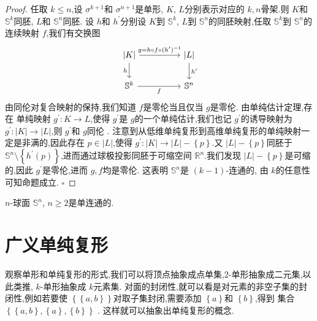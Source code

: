 \documentclass[../../几何与拓扑.tex]{subfiles}
\begin{document}
\begin{proof}
    任取 \(  k\le n  \),设 \(   \sigma ^{k+ 1}  \)和 \(   \sigma ^{n+ 1}  \)是单形, \(  K  \), \(  L  \)分别表示对应的 \(  k , n  \)骨架.则 \(  K  \)和 \(  \mathbb{S}^{k}  \)同胚, \(  L  \)和 \(  \mathbb{S}^{n}  \)同胚.
    设 \(  h  \)和 \(  h^{\prime}   \)分别设 \(  K  \)到 \(  \mathbb{S}^{k}  \), \(  L  \)到 \(  \mathbb{S}^{n}  \)的同胚映射,任取 \(  \mathbb{S}^{k}  \)到 \(  \mathbb{S}^{n}  \)的连续映射 \(  f  \),我们有交换图                  
    \[\begin{tikzcd}
	{|K|} && {|L|} \\
	{\mathbb{S}^k} && {\mathbb{S}^n}
	\arrow["{g = h\circ f\circ (h^{\prime})^{-1}}", from=1-1, to=1-3]
	\arrow["h"', from=1-1, to=2-1]
	\arrow["{h^{\prime}}", from=1-3, to=2-3]
	\arrow["f"', from=2-1, to=2-3]
\end{tikzcd}\]
    由同伦对复合映射的保持,我们知道 \(  f  \)是零伦当且仅当 \(  g  \)是零伦. 
    由单纯估计定理,存在 单纯映射 \(  g^{\prime} : K\to L  \),使得 \(  g^{\prime}   \)是 \(  g  \)的一个单纯估计,我们也记 \(  g^{\prime}   \)的诱导映射为 \(  g^{\prime} : \left| K \right|\to \left| L \right|    \),则 \(  g^{\prime}   \)和 \(  g  \)同伦  .     
    注意到从低维单纯复形到高维单纯复形的单纯映射一定是非满的,因此存在 \(  p \in \left| L \right|   \),使得 \(  g^{\prime} : \left| K \right|\to  \left| L \right|-\left\{ p \right\}    \).又 \(  \left| L \right|-\left\{ p \right\}   \)同胚于 \(  \mathbb{S}^{n}\setminus \left\{ h^{\prime} \left( p \right)  \right\}  \),进而通过球极投影同胚于可缩空间 \(  \mathbb{R} ^{n}  \).我们发现 \(  \left| L \right|-\left\{ p \right\}   \)是可缩的,因此 \(  g^{\prime}   \)是零伦,进而 \(  g, f  \)均是零伦.
    这表明 \(  \mathbb{S}^{n}  \)是 \(  \left( k-1 \right)   \)-连通的, 由 \(  k  \)的任意性可知命题成立.           
    \hfill $\square$
\end{proof}




\begin{corollary}
     \(  n  \)-球面 \(  \mathbb{S}^{n}  \), \(  n\ge 2  \)是单连通的.   
\end{corollary}


\section{广义单纯复形}

观察单形和单纯复形的形式,我们可以将顶点抽象成点单集,2-单形抽象成二元集,以此类推, \(  k  \)-单形抽象成 \(  k  \)元素集.
对面的封闭性,就可以看是对元素的非空子集的封闭性,例如若要使 \(  \left\{ \left\{ a,b \right\} \right\}  \)对取子集封闭,需要添加 \(  \left\{ a \right\}  \)和 \(  \left\{ b \right\}  \),得到 集合 \(  \left\{ \left\{ a,b \right\},\left\{ a \right\},\left\{ b \right\} \right\}  \)    .
这样就可以抽象出单纯复形的概念.
\end{document}
